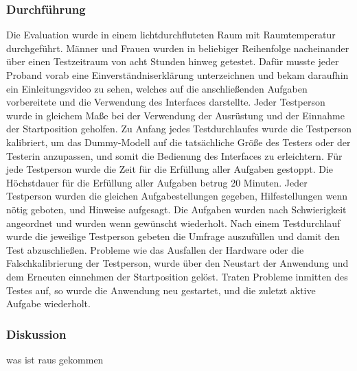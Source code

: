 \subsubsection{Durchführung}
Die Evaluation wurde in einem lichtdurchfluteten Raum mit Raumtemperatur durchgeführt. Männer und Frauen wurden in beliebiger Reihenfolge nacheinander über einen Testzeitraum von acht Stunden hinweg getestet. Dafür musste jeder Proband vorab eine Einverständniserklärung unterzeichnen und bekam daraufhin ein Einleitungsvideo zu sehen, welches auf die anschließenden Aufgaben vorbereitete und die Verwendung des Interfaces darstellte. Jeder Testperson wurde in gleichem Maße bei der Verwendung der Ausrüstung und der Einnahme der Startposition geholfen. Zu Anfang jedes Testdurchlaufes wurde die Testperson kalibriert, um das Dummy-Modell auf die tatsächliche Größe des Testers oder der Testerin anzupassen, und somit die Bedienung des Interfaces zu erleichtern. Für jede Testperson wurde die Zeit für die Erfüllung aller Aufgaben gestoppt. Die Höchstdauer für die Erfüllung aller Aufgaben betrug 20 Minuten. Jeder Testperson wurden die gleichen Aufgabestellungen gegeben, Hilfestellungen wenn nötig geboten, und Hinweise aufgesagt. Die Aufgaben wurden nach Schwierigkeit angeordnet und wurden wenn gewünscht wiederholt. Nach einem Testdurchlauf wurde die jeweilige Testperson gebeten die Umfrage auszufüllen und damit den Test abzuschließen. Probleme wie das Ausfallen der Hardware oder die Falschkalibrierung der Testperson, wurde über den Neustart der Anwendung und dem Erneuten einnehmen der Startposition gelöst. Traten Probleme inmitten des Testes auf, so wurde die Anwendung neu gestartet, und die zuletzt aktive Aufgabe wiederholt.

\subsubsection{Diskussion}
was ist raus gekommen
